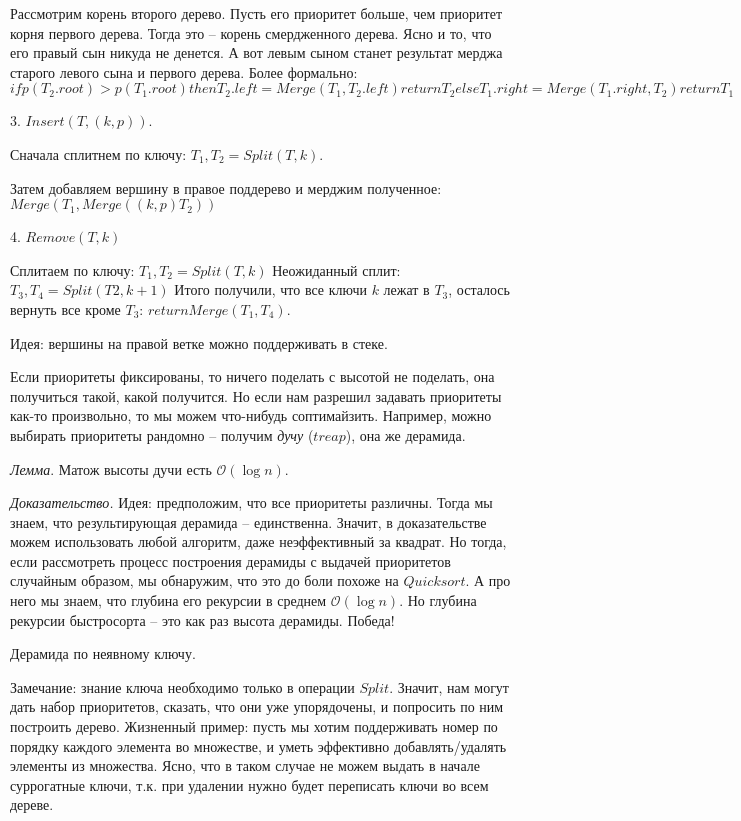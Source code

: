 \documentclass[fleqn, 12pt]{article}
\newcommand{\bigo}{\mathcal{O}}
\begin{document}
Рассмотрим корень второго дерево. Пусть его приоритет больше, чем приоритет корня первого дерева. Тогда это -- корень смердженного дерева. Ясно и то, что его правый сын никуда не денется. А вот левым сыном станет результат мерджа старого левого сына и первого дерева. Более формально:
$if p(T_2.root) > p(T_1.root) then
	T_2.left = Merge (T_1, T_2.left)
	return T_2
else 
	T_1.right = Merge(T_1.right, T_2)
	return T_1$
	
3. $ Insert (T, (k, p)) $.

Сначала сплитнем по ключу: $ T_1, T_2 = Split (T, k) $.

Затем добавляем вершину в правое поддерево и мерджим полученное: $ Merge (T_1, Merge ( (k, p) T_2 )) $

4. $ Remove (T, k) $

Сплитаем по ключу: $ T_1, T_2 = Split (T, k) $
Неожиданный сплит: $ T_3, T_4 = Split (T2, k + 1) $
Итого получили, что все ключи $ k $ лежат в $ T_3 $, осталось вернуть все кроме $ T_3 $: $ return Merge (T_1, T_4) $. 

Идея: вершины на правой ветке можно поддерживать в стеке. 

\bigskip

Если приоритеты фиксированы, то ничего поделать с высотой не поделать, она получиться такой, какой получится. Но если нам разрешил задавать приоритеты как-то произвольно, то мы можем что-нибудь соптимайзить. Например, можно выбирать приоритеты рандомно -- получим \textit{дучу} ($ treap $), она же дерамида. 

\textit{Лемма}. Матож высоты дучи есть $ \bigo(\log n) $. 

\textit{Доказательство.} Идея: предположим, что все приоритеты различны. Тогда мы знаем, что результирующая дерамида -- единственна. Значит, в доказательстве можем использовать любой алгоритм, даже неэффективный за квадрат. Но тогда, если рассмотреть процесс построения дерамиды с выдачей приоритетов случайным образом, мы обнаружим, что это до боли похоже на $ Quicksort $. А про него мы знаем, что глубина его рекурсии в среднем $ \bigo(\log n) $. Но глубина рекурсии быстросорта -- это как раз высота дерамиды. Победа!

\bigskip

Дерамида по неявному ключу.

Замечание: знание ключа необходимо только в операции $ Split $. Значит, нам могут дать набор приоритетов, сказать, что они уже упорядочены, и попросить по ним построить дерево. Жизненный пример: пусть мы хотим поддерживать номер по порядку каждого элемента во множестве, и уметь эффективно добавлять/удалять элементы из множества. Ясно, что в таком случае не можем выдать в начале суррогатные ключи, т.к. при удалении нужно будет переписать ключи во всем дереве. 
\end{document}
